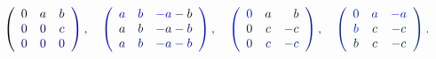 \documentclass[12pt]{article}
\begin{document}
\makeatletter
\renewcommand*{\@textcolor}[3]{%
  \protect\leavevmode
  \begingroup
    \color#1{#2}#3%
  \endgroup
}
\makeatother
\begin{displaymath}
\mathcolor[RGB]{0,0,15}{\left(} \begin{array} {ccc} { \mathcolor[RGB]{0,0,30}{0} } & { \mathcolor[RGB]{0,0,45}{a} } & { \mathcolor[RGB]{0,0,60}{b} } \\ { \mathcolor[RGB]{0,0,75}{0} } & { \mathcolor[RGB]{0,0,90}{0} } & { \mathcolor[RGB]{0,0,105}{c} } \\ { \mathcolor[RGB]{0,0,120}{0} } & { \mathcolor[RGB]{0,0,135}{0} } & { \mathcolor[RGB]{0,0,150}{0} } \end{array} \mathcolor[RGB]{0,0,165}{\right)} \mathcolor[RGB]{0,0,180}{,} \quad \mathcolor[RGB]{0,0,195}{\left(} \begin{array} {ccc} { \mathcolor[RGB]{0,0,210}{a} } & { \mathcolor[RGB]{0,0,225}{b} } & { \mathcolor[RGB]{0,0,240}{-} \mathcolor[RGB]{0,0,255}{a} \mathcolor[RGB]{0,15,0}{-} \mathcolor[RGB]{0,15,15}{b} } \\ { \mathcolor[RGB]{0,15,30}{a} } & { \mathcolor[RGB]{0,15,45}{b} } & { \mathcolor[RGB]{0,15,60}{-} \mathcolor[RGB]{0,15,75}{a} \mathcolor[RGB]{0,15,90}{-} \mathcolor[RGB]{0,15,105}{b} } \\ { \mathcolor[RGB]{0,15,120}{a} } & { \mathcolor[RGB]{0,15,135}{b} } & { \mathcolor[RGB]{0,15,150}{-} \mathcolor[RGB]{0,15,165}{a} \mathcolor[RGB]{0,15,180}{-} \mathcolor[RGB]{0,15,195}{b} } \end{array} \mathcolor[RGB]{0,15,210}{\right)} \mathcolor[RGB]{0,15,225}{,} \quad \mathcolor[RGB]{0,15,240}{\left(} \begin{array} {ccr} { \mathcolor[RGB]{0,15,255}{0} } & { \mathcolor[RGB]{0,30,0}{a} } & { \mathcolor[RGB]{0,30,15}{b} } \\ { \mathcolor[RGB]{0,30,30}{0} } & { \mathcolor[RGB]{0,30,45}{c} } & { \mathcolor[RGB]{0,30,60}{-} \mathcolor[RGB]{0,30,75}{c} } \\ { \mathcolor[RGB]{0,30,90}{0} } & { \mathcolor[RGB]{0,30,105}{c} } & { \mathcolor[RGB]{0,30,120}{-} \mathcolor[RGB]{0,30,135}{c} } \end{array} \mathcolor[RGB]{0,30,150}{\right)} \mathcolor[RGB]{0,30,165}{,} \quad \mathcolor[RGB]{0,30,180}{\left(} \begin{array} {ccc} { \mathcolor[RGB]{0,30,195}{0} } & { \mathcolor[RGB]{0,30,210}{a} } & { \mathcolor[RGB]{0,30,225}{-} \mathcolor[RGB]{0,30,240}{a} } \\ { \mathcolor[RGB]{0,30,255}{b} } & { \mathcolor[RGB]{0,45,0}{c} } & { \mathcolor[RGB]{0,45,15}{-} \mathcolor[RGB]{0,45,30}{c} } \\ { \mathcolor[RGB]{0,45,45}{b} } & { \mathcolor[RGB]{0,45,60}{c} } & { \mathcolor[RGB]{0,45,75}{-} \mathcolor[RGB]{0,45,90}{c} } \end{array} \mathcolor[RGB]{0,45,105}{\right)} \mathcolor[RGB]{0,45,120}{.}
\end{displaymath}
\end{document}
